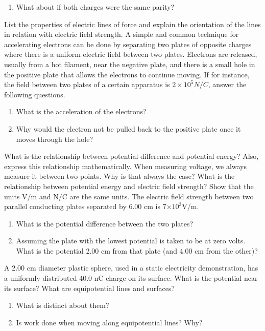 \documentclass[12pt,addpoints]{exam}
\begin{document}
\begin{questions}
\begin{enumerate}[label=(\roman*)]
			\item What about if both charges were the same parity?
		\end{enumerate}
		\question List the properties of electric lines of force and explain the orientation of the lines in relation with electric field strength.
		\question A simple and common technique for accelerating electrons can be done by separating two plates of opposite charges where there is a uniform electric field between two plates. Electrons are released, usually from a hot filament, near the negative plate, and there is a small hole in the positive plate that allows the electrons to continue moving. If for instance, the field between two plates of a certain apparatus is $2\times10^{5}N/C$, answer the following questions.
		\begin{enumerate}[label=(\roman*)]
			\item What is the acceleration of the electrons?
			\item Why would the electron not be pulled back to the positive plate once it moves through the hole?
		\end{enumerate}
		\question What is the relationship between potential difference and potential energy? Also, express this relationship mathematically.
		\question When measuring voltage, we always measure it between two points. Why is that always the case?
		\question What is the relationship between potential energy and electric field strength?
		\question Show that the units V/m and N/C are the same units.
		\question The electric field strength between two parallel conducting plates separated by 6.00 cm is 7$\times10^{3}$V/m.
		\begin{enumerate}[label=(\roman*)]
			\item What is the potential difference between the two plates?
			\item Assuming the plate with the lowest potential is taken to be at zero volts. What is the potential 2.00 cm from that plate (and 4.00 cm from the other)?
		\end{enumerate}
		\question A 2.00 cm diameter plastic sphere, used in a static electricity demonstration, has a uniformly distributed 40.0 nC charge on its surface. What is the potential near its surface?
		\question What are equipotential lines and surfaces? 
		\begin{enumerate}[label=(\roman*)]
			\item What is distinct about them?
			\item Is work done when moving along equipotential lines? Why? 

\end{enumerate}
\end{questions}
\end{document}
